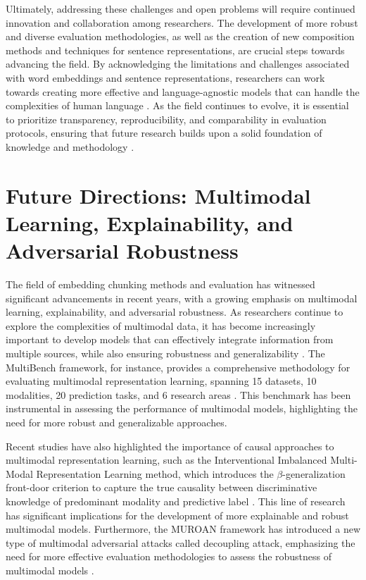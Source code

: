 \documentclass[conference]{IEEEtran}
\begin{document}
Ultimately, addressing these challenges and open problems will require continued innovation and collaboration among researchers. The development of more robust and diverse evaluation methodologies, as well as the creation of new composition methods and techniques for sentence representations, are crucial steps towards advancing the field. By acknowledging the limitations and challenges associated with word embeddings and sentence representations, researchers can work towards creating more effective and language-agnostic models that can handle the complexities of human language \cite{b14}. As the field continues to evolve, it is essential to prioritize transparency, reproducibility, and comparability in evaluation protocols, ensuring that future research builds upon a solid foundation of knowledge and methodology \cite{b15}.

\section{Future Directions: Multimodal Learning, Explainability, and Adversarial Robustness}
The field of embedding chunking methods and evaluation has witnessed significant advancements in recent years, with a growing emphasis on multimodal learning, explainability, and adversarial robustness. As researchers continue to explore the complexities of multimodal data, it has become increasingly important to develop models that can effectively integrate information from multiple sources, while also ensuring robustness and generalizability \cite{b1}. The MultiBench framework, for instance, provides a comprehensive methodology for evaluating multimodal representation learning, spanning 15 datasets, 10 modalities, 20 prediction tasks, and 6 research areas \cite{b2}. This benchmark has been instrumental in assessing the performance of multimodal models, highlighting the need for more robust and generalizable approaches.

Recent studies have also highlighted the importance of causal approaches to multimodal representation learning, such as the Interventional Imbalanced Multi-Modal Representation Learning method, which introduces the $\beta$-generalization front-door criterion to capture the true causality between discriminative knowledge of predominant modality and predictive label \cite{b3}. This line of research has significant implications for the development of more explainable and robust multimodal models. Furthermore, the MUROAN framework has introduced a new type of multimodal adversarial attacks called decoupling attack, emphasizing the need for more effective evaluation methodologies to assess the robustness of multimodal models \cite{b4}.
\end{document}
